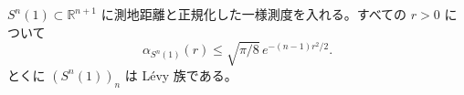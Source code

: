 $S^n(1) \subset \mathbb{R}^{n+1}$ に測地距離と正規化した一様測度を入れる。すべての $r > 0$ について
\[
  \alpha_{S^n(1)}(r) \le \sqrt{\pi/8}\, e^{-(n-1) r^2 / 2}.
\]
とくに $(S^n(1))_n$ は Lévy 族である。
